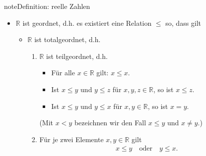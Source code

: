 \documentclass[letterpaper,10pt,english]{jupyterBook}
\begin{document}
\begin{sphinxadmonition}{note}{Definition: reelle Zahlen}
\begin{itemize}
\begin{itemize}
\item {} 
Inverse Elemente
\begin{equation*}
\begin{split}\begin{split}
    \forall a\in \mathbb{R}\ \exists a'\in\mathbb{R} : a + a' = 0\\
    \forall a\in \mathbb{R}\setminus \{ 0\}\ \exists \tilde{a}\in\mathbb{R} : a \cdot \tilde{a} = 1
    \end{split}\end{split}
\end{equation*}
Schreibweise: \(-a := a', a - a := a + (-a), \frac{1}{a} := \tilde{a}, \frac{a}{a} := a\cdot \frac{1}{a}\)

\item {} 
Distributivgesetz
\begin{equation*}
\begin{split}a\cdot (b+c) = a\cdot b + a\cdot c\end{split}
\end{equation*}
\end{itemize}

\item {} 
\(\mathbb{R}\) ist geordnet, d.h. es existiert eine Relation \(\le\) so, dass gilt
\begin{itemize}
\item {} 
\(\mathbb{R}\) ist totalgeordnet, d.h.
\begin{enumerate}
%
\item {} 
\(\mathbb{R}\) ist teilgeordnet, d.h.
\begin{itemize}
\item {} 
Für alle \(x\in\mathbb{R}\) gilt: \(x \le x\).

\item {} 
Ist \(x \le y\) und \(y\le z\) für \(x,y,z\in\mathbb{R}\), so ist \(x \le z\).

\item {} 
Ist \(x \le y\) und \(y \le x\) für \(x,y \in \mathbb{R}\), so ist \(x = y\).

\end{itemize}

(Mit \(x<y\) bezeichnen wir den Fall \(x \le y\) und \(x \not= y\).)

\item {} 
Für je zwei Elemente \(x,y \in\mathbb{R}\) gilt
\begin{equation*}
\begin{split}x \le y\quad \text{oder}\quad y\le x.\end{split}
\end{equation*}
\end{enumerate}


\end{itemize}
\end{itemize}
\end{sphinxadmonition}
\end{document}
